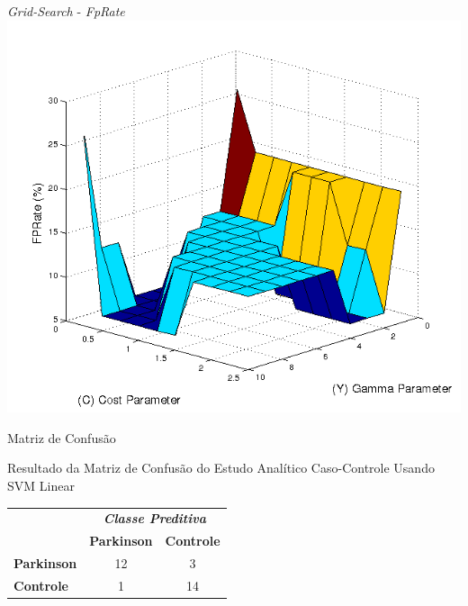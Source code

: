 \documentclass{beamer}
\begin{document}
\begin{frame}{\textit{Grid-Search} - \textit{FpRate}}
      \includegraphics[scale=0.5]{./img/gridsearchfprate.png}
\end{frame}

\begin{frame}{Matriz de Confusão}
	\begin{block}{Resultado da Matriz de Confusão do Estudo Analítico Caso-Controle Usando SVM Linear}
\begin{table}[!htbp]
		\label{table:resultadomatrizconfusaosvm}
		\centering
		\begin{tabular}{l|c|c|}
		\cline{2-3}
		\multicolumn{1}{c}{}                         & \multicolumn{2}{|c|}{\textit{\textbf{Classe Preditiva}}} \\ \cline{2-3} 
																								 & \textbf{Parkinson}      & \textbf{Controle}         \\ \hline
		\multicolumn{1}{|l|}{\textbf{Parkinson}} & 12       & 3           \\ \hline
		\multicolumn{1}{|l|}{\textbf{Controle}}     & 1           & 14     \\ \hline
		\end{tabular}
\end{table}
	\end{block}
\end{frame}
\end{document}
